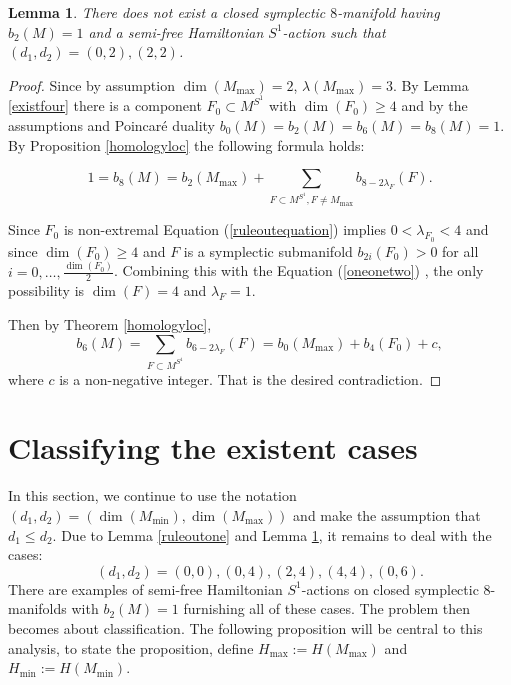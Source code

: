 \documentclass[12pt]{article}
\newtheorem{lemma}[theorem]{Lemma}
\begin{document}
\begin{lemma} \label{ruleouttwo}
There does not exist a closed symplectic $8$-manifold having $b_{2}(M) =1$ and a semi-free Hamiltonian $S^1$-action such that $(d_1,d_2) = (0,2), (2,2)$. 
\end{lemma}
\begin{proof}
Since by assumption $\dim(M_{\max})=2$, $\lambda(M_{\max}) = 3$. By Lemma \ref{existfour} there is a component $F_0 \subset M^{S^1}$ with $\dim(F_0) \geq 4 $ and by the assumptions and Poincar\'{e} duality $b_{0}(M)= b_{2}(M)= b_{6}(M)= b_{8}(M)=1$. By Proposition \ref{homologyloc} the following formula holds: 


\begin{equation} \label{ruleoutequation}  
1= b_{8}(M) = b_{2}(M_{\max}) +  \sum_{F \subset M^{S^1}, F \neq M_{\max}} b_{8-2\lambda_{F}}(F).  \end{equation}

Since $F_0$ is non-extremal Equation (\ref{ruleoutequation}) implies $0<\lambda_{F_0} <4$ and since $\dim(F_0) \geq 4$ and $F$ is a symplectic submanifold $b_{2i}(F_0)>0$ for all $i=0, \ldots, \frac{\dim(F_0)}{2}$. Combining this with the Equation  (\ref{oneonetwo}) , the only possibility is $\dim(F)=4$ and $\lambda_{F}=1$.

 Then by Theorem \ref{homologyloc}, $$b_{6}(M)  = \sum_{F \subset M^{S^1}} b_{6-2\lambda_{F}}(F) = b_{0}(M_{\max}) + b_{4}(F_0) + c, $$ where $c$ is a non-negative integer. That is the desired contradiction. 
\end{proof}







\section{Classifying the existent cases} \label{excases}
In this section, we continue to use the notation $(d_1,d_{2}) = (\dim(M_{\min}),\dim(M_{\max}))$ and make the assumption that $d_{1} \leq d_{2}$. Due to Lemma \ref{ruleoutone} and Lemma \ref{ruleouttwo}, it remains to deal with the cases: $$(d_{1},d_{2}) = (0,0),(0,4),(2,4),(4,4),(0,6).$$ There are examples of semi-free Hamiltonian $S^1$-actions on closed symplectic $8$-manifolds with $b_{2}(M)=1$ furnishing all of these cases. The problem then becomes about classification. The following proposition will be central to this analysis, to state the proposition, define $H_{\max} := H(M_{\max})$ and $H_{\min} := H(M_{\min})$.
\end{document}
